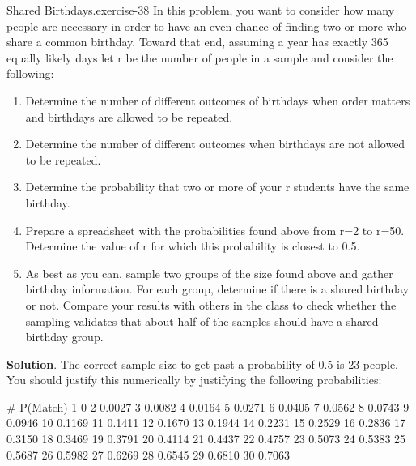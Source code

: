 \documentclass[10pt,]{book}
\numberwithin{equation}{section}
\begin{document}
%
\par
\hypertarget{p-619}{}%
\begin{inlineexercise}{Shared Birthdays.}{exercise-38}%
\hypertarget{p-620}{}%
In this problem, you want to consider how many people are necessary in order to have an even chance of finding two or more who share a common birthday. Toward that end, assuming a year has exactly 365 equally likely days let r be the number of people in a sample and consider the following: \leavevmode%
\begin{enumerate}
\item\hypertarget{li-168}{}Determine the number of different outcomes of birthdays when order matters and birthdays are allowed to be repeated.%
\item\hypertarget{li-169}{}Determine the number of different outcomes when birthdays are not allowed to be repeated.%
\item\hypertarget{li-170}{}Determine the probability that two or more of your r students have the same birthday.%
\item\hypertarget{li-171}{}Prepare a spreadsheet with the probabilities found above from r=2 to r=50. Determine the value of r for which this probability is closest to 0.5.%
\item\hypertarget{li-172}{}As best as you can, sample two groups of the size found above and gather birthday information. For each group, determine if there is a shared birthday or not.  Compare your results with others in the class to check whether the sampling validates that about half of the samples should have a shared birthday group.%
\end{enumerate}
%
\par\smallskip%
\noindent\textbf{Solution}.\hypertarget{solution-15}{}\quad%
\hypertarget{p-621}{}%
The correct sample size to get past a probability of 0.5 is 23 people. You should justify this numerically by justifying the following probabilities:\begin{preformatted}
#	P(Match)	
1	0
2	0.0027
3	0.0082
4	0.0164
5	0.0271
6	0.0405
7	0.0562
8	0.0743
9	0.0946
10	0.1169
11	0.1411
12	0.1670
13	0.1944
14	0.2231
15	0.2529
16	0.2836
17	0.3150
18	0.3469
19	0.3791
20	0.4114
21	0.4437
22	0.4757
23	0.5073
24	0.5383
25	0.5687
26	0.5982
27	0.6269
28	0.6545
29	0.6810
30	0.7063
\end{preformatted}
%
\end{inlineexercise}
%
\par
\hypertarget{p-622}{}%
\end{document}
